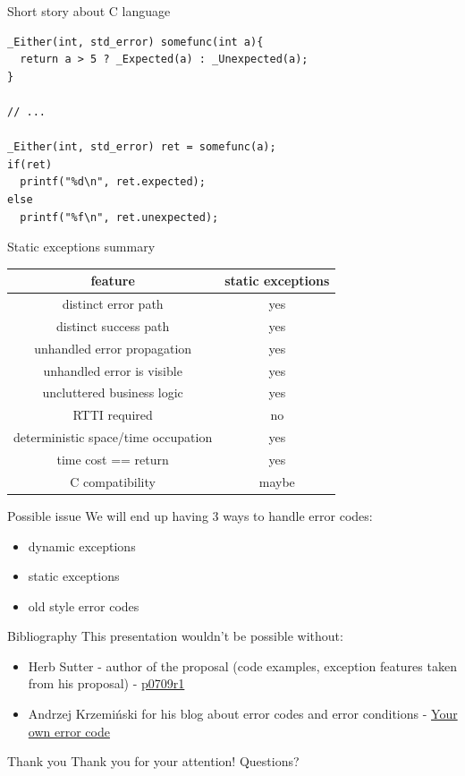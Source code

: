 \documentclass[10pt]{beamer}
\begin{document}
\begin{frame}[fragile]{Short story about C language}
	\begin{verbatim}
_Either(int, std_error) somefunc(int a){
  return a > 5 ? _Expected(a) : _Unexpected(a);
}

// ...

_Either(int, std_error) ret = somefunc(a);
if(ret)
  printf("%d\n", ret.expected);
else
  printf("%f\n", ret.unexpected);
	\end{verbatim}
\end{frame}

\begin{frame}{Static exceptions summary}
\centering
	\begin{tabular}{|c|c|}
		\hline
		feature & static exceptions \\ \hline \hline
		distinct error path & yes \\ \hline
		distinct success path & yes \\ \hline \hline
		unhandled error propagation & yes \\ \hline
		unhandled error is visible & yes \\ \hline
		uncluttered business logic & yes \\ \hline \hline
		RTTI required & no \\ \hline
		deterministic space/time occupation & yes \\ \hline
		time cost == return & yes \\ \hline \hline
		C compatibility & maybe \\ \hline
	\end{tabular}
\end{frame}

\begin{frame}{Possible issue}
	We will end up having 3 ways to handle error codes:
	\begin{itemize}
		\item dynamic exceptions
		\item static exceptions
		\item old style error codes
	\end{itemize}
\end{frame}

\begin{frame}{Bibliography}
	This presentation wouldn't be possible without:
	
	\begin{itemize}
		\item Herb Sutter - author of the proposal (code examples, exception features taken from his proposal) -  \href{http://www.open-std.org/jtc1/sc22/wg21/docs/papers/2018/p0709r1.pdf}{p0709r1}
		
		\item Andrzej Krzemiński for his blog about error codes and error conditions -  \href{https://akrzemi1.wordpress.com/2017/07/12/your-own-error-code/}{Your own error code}
	\end{itemize}
\end{frame}

\begin{frame}{Thank you}
	\centering
	Thank you for your attention!
	\vfill
	Questions?
\end{frame}
	
\end{document}
